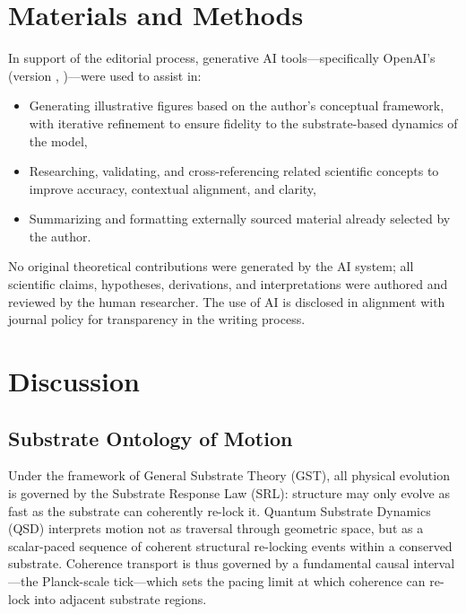 \documentclass[preprints,article,submit,pdftex,moreauthors]{Definitions/mdpi}
\begin{document}
\section{Materials and Methods}
\qsdmethodstatement
In support of the editorial process, generative AI tools—specifically OpenAI's \qsdgptname (version \qsdgptver, \qsdgptyear)—were used to assist in:
\begin{itemize}
    \item Generating illustrative figures based on the author’s conceptual framework, with iterative refinement to ensure fidelity to the substrate-based dynamics of the model,
    \item Researching, validating, and cross-referencing related scientific concepts to improve accuracy, contextual alignment, and clarity,
    \item Summarizing and formatting externally sourced material already selected by the author.
\end{itemize}

No original theoretical contributions were generated by the AI system; all scientific claims, hypotheses, derivations, and interpretations were authored and reviewed by the human researcher. The use of AI is disclosed in alignment with journal policy for transparency in the writing process.


\section{Discussion}
\subsection{Substrate Ontology of Motion}

Under the framework of General Substrate Theory (GST), all physical evolution is governed by the Substrate Response Law (SRL): structure may only evolve as fast as the substrate can coherently re-lock it. Quantum Substrate Dynamics (QSD) interprets motion not as traversal through geometric space, but as a scalar-paced sequence of coherent structural re-locking events within a conserved substrate. Coherence transport is thus governed by a fundamental causal interval---the Planck-scale tick---which sets the pacing limit at which coherence can re-lock into adjacent substrate regions.
\end{document}

